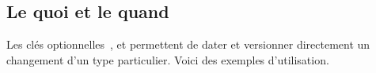 \documentclass{tutodoc}
\begin{document}
\subsection{Le quoi et le quand}

Les clés optionnelles \,,  et  permettent de dater et versionner directement un changement d'un type particulier. Voici des exemples d'utilisation.

\end{document}
